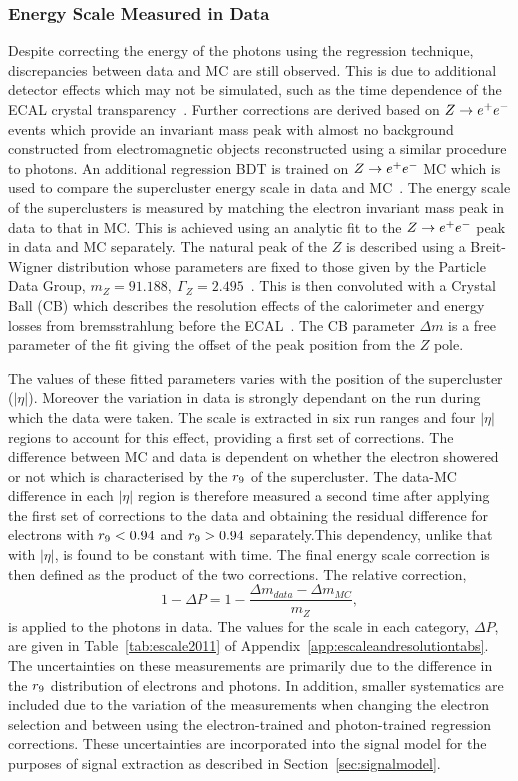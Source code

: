 \subsubsection{Energy Scale Measured in Data}
Despite correcting the energy of the photons using the regression technique, discrepancies between data and
MC are still observed. This is due to additional detector effects which may not be simulated, such as the
time dependence of the ECAL crystal transparency~\citep{null}. Further corrections are
derived based on $Z\rightarrow e^{+}e^{-}$ events which provide an invariant mass peak with almost no background constructed from 
electromagnetic objects reconstructed using a similar procedure to photons.
An additional regression BDT is trained on $Z\rightarrow e^{+}e^{-}$ MC which is used
to compare the supercluster energy scale in data and MC~\citep{AN-12-048}.
The energy scale of the superclusters is measured by matching the electron
invariant mass peak in data to that in MC. This is achieved using an analytic fit to the $Z\rightarrow e^{+}e^{-}$ peak in data and MC
separately. The natural peak of the $Z$ is described using a Breit-Wigner distribution whose parameters are fixed
to those given by the Particle Data Group, $m_{Z}=91.188,~\Gamma_{Z} = 2.495$~\citep{pdg}. This is then convoluted 
with a Crystal Ball (CB) which describes the resolution effects of the calorimeter and energy losses from 
bremsstrahlung before the ECAL~\citep{crystalball}. 
The CB parameter $\Delta m$ is a free parameter of the fit giving the 
offset of the peak position from the $Z$ pole. 

The values of these fitted parameters varies with the position of the supercluster ($|\eta|$). Moreover the
variation in data is strongly dependant on the run during which the data were taken. The scale is extracted in 
six run ranges and four $|\eta|$ regions to account for this effect, providing a first set of corrections. 
The difference between MC and data is dependent on whether the electron showered or not which 
is characterised by the $r_{9}$ of the supercluster. 
The data-MC difference in each $|\eta|$ region is therefore measured
a second time after applying the first set of corrections to the data and obtaining the residual difference
for electrons with $r_{9}<0.94$ and $r_{9}>0.94$ separately.This dependency, 
unlike that with $|\eta|$, is found to be constant with time. The final energy scale correction is then defined
as the product of the two corrections. The relative correction, 
\begin{equation}
1-\Delta P = 1 - \frac {\displaystyle \Delta m_{data} - \Delta m_{MC} }{\displaystyle m_{Z} },
\end{equation}
is applied to the photons in data. The values for the scale in each category, $\Delta P$, are given in 
Table~\ref{tab:escale2011} of Appendix~\ref{app:escaleandresolutiontabs}. 
The uncertainties on these measurements are primarily due to 
the difference in the $r_{9}$ distribution of electrons and photons. In addition, smaller systematics
are included due to the variation of the measurements when changing the electron selection and
between using the electron-trained and photon-trained regression corrections.
These uncertainties are incorporated into the signal model for the purposes of 
signal extraction as described in Section~\ref{sec:signalmodel}.

